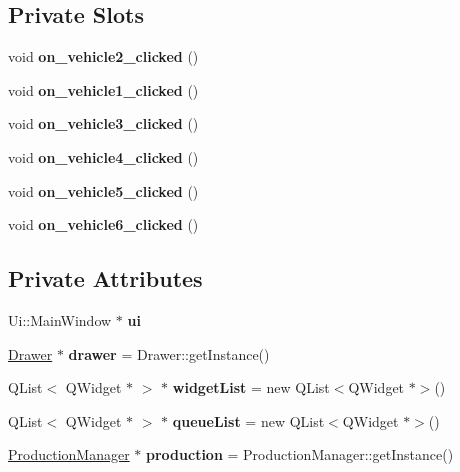 \subsection*{Private Slots}
\begin{DoxyCompactItemize}
\item 
\mbox{\label{classMainWindow_acd68af0999b87e5ea42881e5e456a11a}} 
void {\bfseries on\+\_\+vehicle2\+\_\+clicked} ()
\item 
\mbox{\label{classMainWindow_a206ebf8e7617c56dfad58e3bbcda425c}} 
void {\bfseries on\+\_\+vehicle1\+\_\+clicked} ()
\item 
\mbox{\label{classMainWindow_a252efba68d5683909c6e28105b7cd570}} 
void {\bfseries on\+\_\+vehicle3\+\_\+clicked} ()
\item 
\mbox{\label{classMainWindow_a6c36533e3fb2bc8c265bb8f551622fc1}} 
void {\bfseries on\+\_\+vehicle4\+\_\+clicked} ()
\item 
\mbox{\label{classMainWindow_aee258501c331a009316ca60bf2d1fef0}} 
void {\bfseries on\+\_\+vehicle5\+\_\+clicked} ()
\item 
\mbox{\label{classMainWindow_a5eb4cb2c4090afe326d8fea75eac9fde}} 
void {\bfseries on\+\_\+vehicle6\+\_\+clicked} ()
\end{DoxyCompactItemize}
\subsection*{Private Attributes}
\begin{DoxyCompactItemize}
\item 
\mbox{\label{classMainWindow_a35466a70ed47252a0191168126a352a5}} 
Ui\+::\+Main\+Window $\ast$ {\bfseries ui}
\item 
\mbox{\label{classMainWindow_aa0e3aaf33f8ae1967a14f245dbbe5a28}} 
\hyperlink{classDrawer}{Drawer} $\ast$ {\bfseries drawer} = Drawer\+::get\+Instance()
\item 
\mbox{\label{classMainWindow_a0f4655aae1c0e7cc1cdcadf9300336b1}} 
Q\+List$<$ Q\+Widget $\ast$ $>$ $\ast$ {\bfseries widget\+List} = new Q\+List$<$Q\+Widget $\ast$$>$()
\item 
\mbox{\label{classMainWindow_aa599d797a0b663cf1c6b1af50a73a865}} 
Q\+List$<$ Q\+Widget $\ast$ $>$ $\ast$ {\bfseries queue\+List} = new Q\+List$<$Q\+Widget $\ast$$>$()
\item 
\mbox{\label{classMainWindow_a8be7e28cdbfc40a8d24f9b9f16887a1a}} 
\hyperlink{classProductionManager}{Production\+Manager} $\ast$ {\bfseries production} = Production\+Manager\+::get\+Instance()
\end{DoxyCompactItemize}


